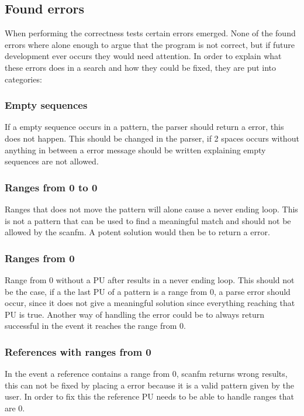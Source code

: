 \documentclass[12pt]{article}
\newcommand{\pu}{PU }
\begin{document}
\subsection{Found errors}
When performing the correctness tests certain errors emerged. None of the found errors where alone
enough to argue that the program is not correct, but if future development ever occurs they would
need attention.
In order to explain what these errors does in a search and how they could be fixed, they are put into
categories:

\subsubsection{Empty sequences}
If a empty sequence occurs in a pattern, the parser should return a error, this does not happen.
This should be changed in the parser, if 2 spaces occurs without anything in between a error message
should be written explaining empty sequences are not allowed.

\subsubsection{Ranges from 0 to 0}
Ranges that does not move the pattern will alone cause a never ending loop. This is not a 
pattern that can be used to find a meaningful match and should not be allowed by the scanfm.
A potent solution would then be to return a error.

\subsubsection{Ranges from 0}
Range from 0 without a \pu after results in a never ending loop. This should not be the case, if a the last
\pu of a pattern is a range from 0, a parse error should occur, since it does not give a meaningful solution
since everything reaching that \pu is true. Another way of handling the error could be to always return successful in the event it reaches the range from 0.

\subsubsection{References with ranges from 0}
In the event a reference contains a range from 0, scanfm returns wrong results, this can not be fixed
by placing a error because it is a valid pattern given by the user. In order to fix this the reference
\pu needs to be able to handle ranges that are 0.
\end{document}
